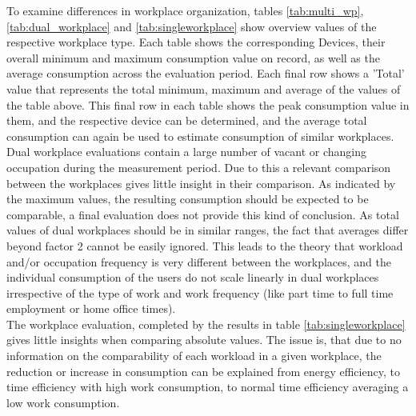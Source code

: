 To examine differences in workplace organization, tables \ref{tab:multi_wp}, \ref{tab:dual_workplace} and \ref{tab:singleworkplace} show overview values of the respective workplace type. Each table shows the corresponding Devices, their overall minimum and maximum consumption value on record, as well as the average consumption across the evaluation period. Each final row shows a 'Total' value that represents the total minimum, maximum and average of the values of the table above. This final row in each table shows the peak consumption value in them, and the respective device can be determined, and the average total consumption can again be used to estimate consumption of similar workplaces. Dual workplace evaluations contain a large number of vacant or changing occupation during the measurement period. Due to this a relevant comparison between the workplaces gives little insight in their comparison. As indicated by the maximum values, the resulting consumption should be expected to be comparable, a final evaluation does not provide this kind of conclusion. As total values of dual workplaces should be in similar ranges, the fact that averages differ beyond factor 2 cannot be easily ignored. This leads to the theory that workload and/or occupation frequency is very different between the workplaces, and the individual consumption of the users do not scale linearly in dual workplaces irrespective of the type of work and work frequency (like part time to full time employment or home office times).\\The workplace evaluation, completed by the results in table \ref{tab:singleworkplace} gives little insights when comparing absolute values. The issue is, that due to no information on the comparability of each workload in a given workplace, the reduction or increase in consumption can be explained from energy efficiency, to time efficiency with high work consumption, to normal time efficiency averaging a low work consumption.
